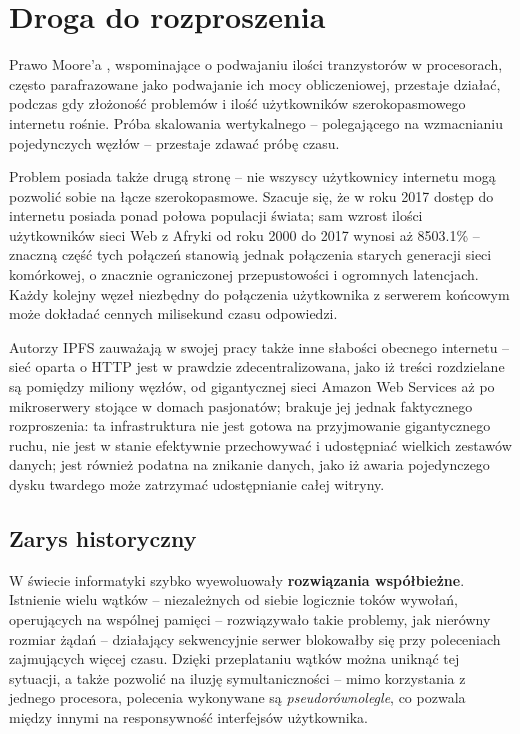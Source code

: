 \chapter{Droga do rozproszenia}
\label{cha:rozproszenie}

Prawo Moore'a \cite{moore1998cramming}, wspominające o podwajaniu ilości tranzystorów w procesorach, często parafrazowane jako podwajanie ich mocy obliczeniowej, przestaje działać, podczas gdy złożoność problemów i ilość użytkowników szerokopasmowego internetu rośnie. 
Próba skalowania wertykalnego -- polegającego na wzmacnianiu pojedynczych węzłów -- przestaje zdawać próbę czasu.

Problem posiada także drugą stronę -- nie wszyscy użytkownicy internetu mogą pozwolić sobie na łącze szerokopasmowe. Szacuje się, że w roku 2017 dostęp do internetu posiada ponad połowa populacji świata; sam wzrost ilości użytkowników sieci Web z Afryki od roku 2000 do 2017 wynosi aż 8503.1\% \cite{webStats} – znaczną część tych połączeń stanowią jednak połączenia starych generacji sieci komórkowej, o znacznie ograniczonej przepustowości i ogromnych latencjach. Każdy kolejny węzeł niezbędny do połączenia użytkownika z serwerem końcowym może dokładać cennych milisekund czasu odpowiedzi. 

Autorzy IPFS zauważają w swojej pracy \cite{ipfsWP} także inne słabości obecnego internetu – sieć oparta o HTTP jest w prawdzie zdecentralizowana, jako iż treści rozdzielane są pomiędzy miliony węzłów, od gigantycznej sieci Amazon Web Services aż po mikroserwery stojące w domach pasjonatów; brakuje jej jednak faktycznego rozproszenia: ta infrastruktura nie jest gotowa na przyjmowanie gigantycznego ruchu, nie jest w stanie efektywnie przechowywać i udostępniać wielkich zestawów danych; jest również podatna na znikanie danych, jako iż awaria pojedynczego dysku twardego może zatrzymać udostępnianie całej witryny. 


\section{Zarys historyczny}
\label{sec:teoriaRozproszenia}
W świecie informatyki szybko wyewoluowały \textbf{rozwiązania współbieżne}. Istnienie wielu wątków -- niezależnych od siebie logicznie toków wywołań, operujących na wspólnej pamięci -- rozwiązywało takie problemy, jak nierówny rozmiar żądań -- działający sekwencyjnie serwer blokowałby się przy poleceniach zajmujących więcej czasu. Dzięki przeplataniu wątków można uniknąć tej sytuacji, a także pozwolić na iluzję symultaniczności -- mimo korzystania z jednego procesora, polecenia wykonywane są {\em pseudorównolegle}, co pozwala między innymi na responsywność interfejsów użytkownika.

